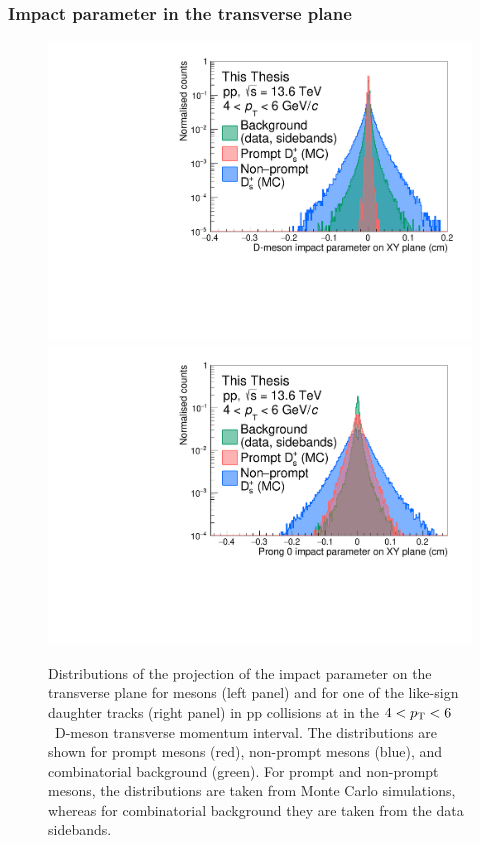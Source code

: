 \subsubsection{Impact parameter in the transverse plane}
\begin{figure}[tb]
    \centering
    \includegraphics[width=0.48\linewidth]{Figures/Chapter 4/ImpactParameterXY.pdf}
    \includegraphics[width=0.48\linewidth]{Figures/Chapter 4/ImpactParameter0.pdf}
    \caption{Distributions of the projection of the impact parameter on the transverse plane for \ds mesons (left panel) and for one of the like-sign daughter tracks (right panel) in pp collisions at \thirteen in the $4 < p_\mathrm{T} < 6$~\gevc D-meson transverse momentum interval. The distributions are shown for prompt \ds mesons (red), non-prompt \ds mesons (blue), and combinatorial background (green). For prompt and non-prompt \ds mesons, the distributions are taken from Monte Carlo simulations, whereas for combinatorial background they are taken from the data sidebands. }
    \label{fig:ImpactParameter}
\end{figure}
